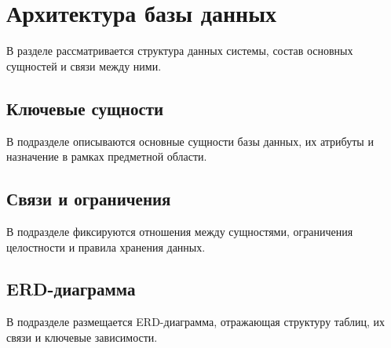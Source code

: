 \section{Архитектура базы данных}
\headingtextsep

В разделе рассматривается структура данных системы, состав основных сущностей и связи между ними.

\textheadingsep
\subsection{Ключевые сущности}
\headingtextsep

В подразделе описываются основные сущности базы данных, их атрибуты и назначение в рамках предметной области.

\textheadingsep
\subsection{Связи и ограничения}
\headingtextsep

В подразделе фиксируются отношения между сущностями, ограничения целостности и правила хранения данных.

\textheadingsep
\subsection{ERD-диаграмма}
\headingtextsep

В подразделе размещается ERD-диаграмма, отражающая структуру таблиц, их связи и ключевые зависимости.